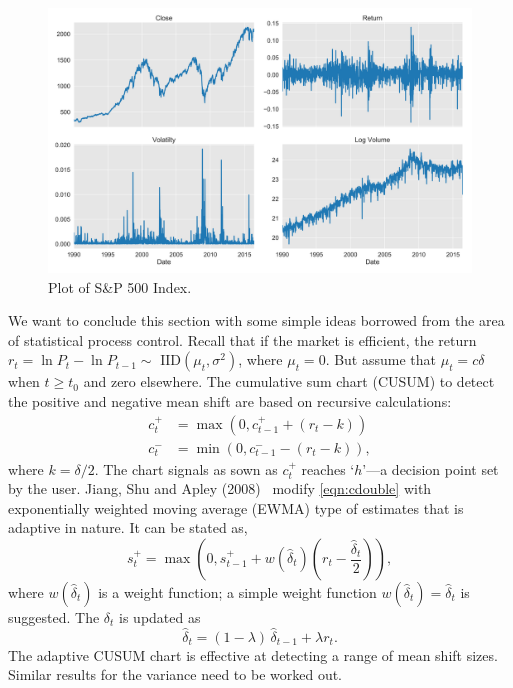 	\begin{figure}[!ht]
	\centering
	\includegraphics[width=\textwidth]{chapters/chapter_advanced/figures/sp500.png}
	\caption{Plot of S\&P 500 Index. \label{fig:sp500}}
	\end{figure}
	

We want to conclude this section with some simple ideas borrowed from the area of statistical process control. Recall that if the market is efficient, the return $r_t= \ln P_t - \ln P_{t-1} \sim \text{ IID}(\mu_t, \sigma^2)$, where $\mu_t=0$. But assume that $\mu_t=c\delta$ when $t\geq t_0$ and zero elsewhere. The cumulative sum chart (CUSUM) to detect the positive and negative mean shift are based on recursive calculations:
	\begin{equation} \label{eqn:cdouble}
	\begin{split}
	c_t^+&= \max(0, c_{t-1}^+ + (r_t-k)) \\
	c_t^-&= \min(0, c_{t-1}^- - (r_t-k)),
	\end{split}
	\end{equation}
where $k= \delta/2$. The chart signals as sown as $c_t^+$ reaches `$h$'---a decision point set by the user. Jiang, Shu and Apley (2008)~\cite{shuap} modify \eqref{eqn:cdouble} with exponentially weighted moving average (EWMA) type of estimates that is adaptive in nature. It can be stated as,
	\begin{equation}\label{eqn:elma}
	s_t^+= \max \left( 0, s_{t-1}^+ + w(\hat{\delta}_t) \left(r_t - \frac{\hat{\delta}_t}{2} \right) \right),
	\end{equation}
where $w(\hat{\delta}_t)$ is a weight function; a simple weight function $w(\hat{\delta}_t)=\hat{\delta}_t$ is suggested. The $\delta_t$ is updated as 
	\begin{equation}\label{eqn:updatedelt}
	\hat{\delta}_t= (1-\lambda)\, \hat{\delta}_{t-1} + \lambda r_t.
	\end{equation}
The adaptive CUSUM chart is effective at detecting a range of mean shift sizes. Similar results for the variance need to be worked out.


